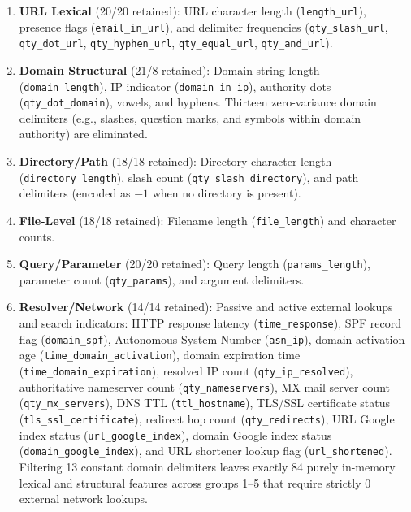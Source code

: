 \begin{enumerate}
    \item \textbf{URL Lexical} (20/20 retained): URL character length (\texttt{length\_url}), presence flags (\texttt{email\_in\_url}), and delimiter frequencies (\texttt{qty\_slash\_url}, \texttt{qty\_dot\_url}, \texttt{qty\_hyphen\_url}, \texttt{qty\_equal\_url}, \texttt{qty\_and\_url}).
    \item \textbf{Domain Structural} (21/8 retained): Domain string length (\texttt{domain\_length}), IP indicator (\texttt{domain\_in\_ip}), authority dots (\texttt{qty\_dot\_domain}), vowels, and hyphens. Thirteen zero-variance domain delimiters (e.g., slashes, question marks, and symbols within domain authority) are eliminated.
    \item \textbf{Directory/Path} (18/18 retained): Directory character length (\texttt{directory\_length}), slash count (\texttt{qty\_slash\_directory}), and path delimiters (encoded as $-1$ when no directory is present).
    \item \textbf{File-Level} (18/18 retained): Filename length (\texttt{file\_length}) and character counts.
    \item \textbf{Query/Parameter} (20/20 retained): Query length (\texttt{params\_length}), parameter count (\texttt{qty\_params}), and argument delimiters.
    \item \textbf{Resolver/Network} (14/14 retained): Passive and active external lookups and search indicators: HTTP response latency (\texttt{time\_response}), SPF record flag (\texttt{domain\_spf}), Autonomous System Number (\texttt{asn\_ip}), domain activation age (\texttt{time\_domain\_activation}), domain expiration time (\texttt{time\_domain\_expiration}), resolved IP count (\texttt{qty\_ip\_resolved}), authoritative nameserver count (\texttt{qty\_nameservers}), MX mail server count (\texttt{qty\_mx\_servers}), DNS TTL (\texttt{ttl\_hostname}), TLS/SSL certificate status (\texttt{tls\_ssl\_certificate}), redirect hop count (\texttt{qty\_redirects}), URL Google index status (\texttt{url\_google\_index}), domain Google index status (\texttt{domain\_google\_index}), and URL shortener lookup flag (\texttt{url\_shortened}). Filtering 13 constant domain delimiters leaves exactly 84 purely in-memory lexical and structural features across groups 1--5 that require strictly 0 external network lookups.
\end{enumerate}

